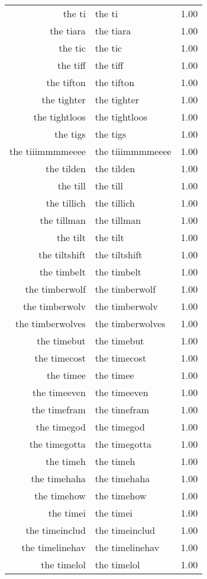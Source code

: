 \begin{table}[ht]
\begin{tabular}{rlr}
  the ti & the ti & 1.00 \\ 
  the tiara & the tiara & 1.00 \\ 
  the tic & the tic & 1.00 \\ 
  the tiff & the tiff & 1.00 \\ 
  the tifton & the tifton & 1.00 \\ 
  the tighter & the tighter & 1.00 \\ 
  the tightloos & the tightloos & 1.00 \\ 
  the tigs & the tigs & 1.00 \\ 
  the tiiimmmmeeee & the tiiimmmmeeee & 1.00 \\ 
  the tilden & the tilden & 1.00 \\ 
  the till & the till & 1.00 \\ 
  the tillich & the tillich & 1.00 \\ 
  the tillman & the tillman & 1.00 \\ 
  the tilt & the tilt & 1.00 \\ 
  the tiltshift & the tiltshift & 1.00 \\ 
  the timbelt & the timbelt & 1.00 \\ 
  the timberwolf & the timberwolf & 1.00 \\ 
  the timberwolv & the timberwolv & 1.00 \\ 
  the timberwolves & the timberwolves & 1.00 \\ 
  the timebut & the timebut & 1.00 \\ 
  the timecost & the timecost & 1.00 \\ 
  the timee & the timee & 1.00 \\ 
  the timeeven & the timeeven & 1.00 \\ 
  the timefram & the timefram & 1.00 \\ 
  the timegod & the timegod & 1.00 \\ 
  the timegotta & the timegotta & 1.00 \\ 
  the timeh & the timeh & 1.00 \\ 
  the timehaha & the timehaha & 1.00 \\ 
  the timehow & the timehow & 1.00 \\ 
  the timei & the timei & 1.00 \\ 
  the timeinclud & the timeinclud & 1.00 \\ 
  the timelinehav & the timelinehav & 1.00 \\ 
  the timelol & the timelol & 1.00 \\ 

\end{tabular}
\end{table}
